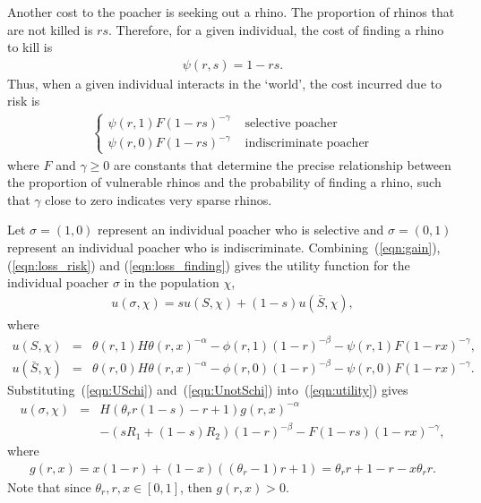 \documentclass[10pt]{article}
\begin{document}
Another cost to the poacher is seeking out a rhino. The proportion of rhinos that are not killed is $rs$. Therefore, for a given individual, the cost of finding a rhino to kill is 
\begin{eqnarray}
\label{eqn:psi}
\psi(r,s) = 1-rs.
\end{eqnarray} 
Thus, when a given individual interacts in the `world', the cost incurred due to risk is
\begin{eqnarray}
\label{eqn:loss_finding}
\left\{
\begin{array}{cl}
\psi(r,1) F(1-rs)^{-\gamma} & \mbox{ selective poacher}
\\
\psi(r,0) F(1-rs)^{-\gamma} & \mbox{ indiscriminate poacher}
\end{array} \right.
\end{eqnarray}
where $F$ and $\gamma \geq 0$ are constants that determine the precise relationship between the proportion of vulnerable rhinos and the probability of finding a rhino, such that $\gamma$ close to zero indicates very sparse rhinos. 

Let  $\sigma = (1,0)$ represent an individual poacher who is selective and $\sigma = (0,1)$ represent an individual poacher who is indiscriminate. Combining~(\ref{eqn:gain}), (\ref{eqn:loss_risk}) and (\ref{eqn:loss_finding}) gives the utility function for the individual poacher $\sigma$ in the population $\chi$, 
\begin{eqnarray}
\label{eqn:utility}
u(\sigma, \chi) = s u(S,\chi) +(1-s) u(\bar{S},\chi), 
\end{eqnarray}
where
\begin{eqnarray}
\label{eqn:USchi}
u(S,\chi) &=& \theta(r,1) H \theta(r,x)^{-\alpha}
- \phi(r,1) (1-r)^{-\beta} 
- \psi(r,1) F(1-rx)^{-\gamma} ,
\\
\label{eqn:UnotSchi}
u(\bar{S},\chi) &=& \theta(r,0) H \theta(r,x)^{-\alpha}
- \phi(r,0) (1-r)^{-\beta}
- \psi(r,0) F(1-rx)^{-\gamma}.
\end{eqnarray}
Substituting~(\ref{eqn:USchi}) and~(\ref{eqn:UnotSchi}) into~(\ref{eqn:utility}) gives
\begin{eqnarray}
\label{eqn:utility2}
u(\sigma, \chi) &=& 
H (\theta_r r(1-s) - r + 1)g(r,x)^{-\alpha} \\ \nonumber &&
-
(sR_1 + (1-s)R_2)(1-r)^{-\beta} - F(1-rs)(1-rx)^{-\gamma},
\end{eqnarray}
where 
\begin{eqnarray}
\label{eqn:g}
g(r,x) = x(1-r)+(1-x)((\theta_r-1)r+1) = \theta_r r +1 -r - x \theta_r r.
\end{eqnarray}
Note that since $\theta_r, r, x  \in [0,1]$, then $g(r,x)>0$.
\end{document}
